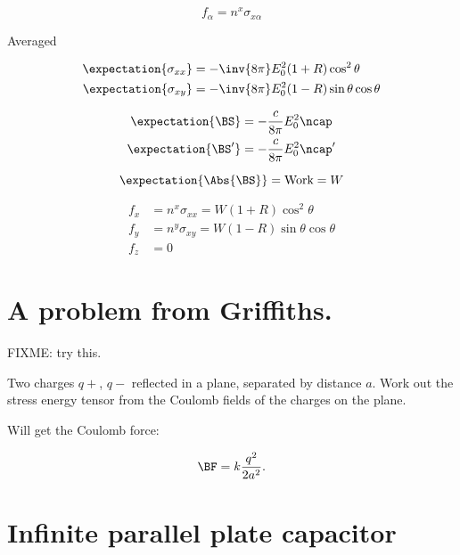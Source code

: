 \begin{equation}\label{eqn:relativisticElectrodynamicsT9:230}
f_\alpha = n^x \sigma_{x \alpha} 
\end{equation}

Averaged

\begin{align}\label{eqn:relativisticElectrodynamicsT9:250}
\expectation{\sigma_{xx}} &= -\inv{8 \pi} E_0^2 ( 1 + R) \cos^2\theta \\
\expectation{\sigma_{xy}} &= -\inv{8 \pi} E_0^2 ( 1 - R) \sin\theta \cos\theta
\end{align}

\begin{align}\label{eqn:relativisticElectrodynamicsT9:270}
\expectation{\BS} &= -\frac{c}{8 \pi} E_0^2 \ncap \\
\expectation{\BS'} &= -\frac{c}{8 \pi} E_0^2 \ncap'
\end{align}

\begin{equation}\label{eqn:relativisticElectrodynamicsT9:290}
\expectation{\Abs{\BS}} = \text{Work} = W
\end{equation}

\begin{align}\label{eqn:relativisticElectrodynamicsT9:310}
f_x &= n^x \sigma_{x x} = W (1 + R) \cos^2\theta \\
f_y &= n^y \sigma_{x y} = W (1 - R) \sin\theta \cos\theta \\
f_z &= 0
\end{align}

\section{A problem from Griffiths.}

FIXME: try this.

Two charges $q+$, $q-$ reflected in a plane, separated by distance $a$.  Work out the stress energy tensor from the Coulomb fields of the charges on the plane.

Will get the Coulomb force:

\begin{equation}\label{eqn:relativisticElectrodynamicsT9:330}
\BF = k \frac{q^2}{2 a^2}.
\end{equation}

\section{Infinite parallel plate capacitor}

